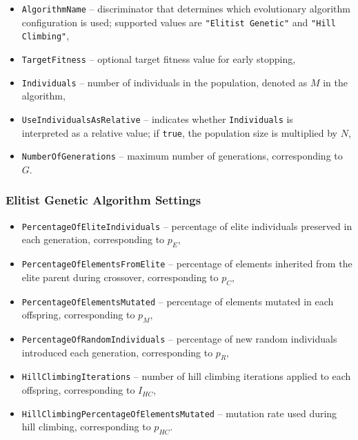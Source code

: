 \begin{itemize}
    \item \texttt{AlgorithmName} -- discriminator that determines which evolutionary algorithm configuration is used; supported values are \texttt{"Elitist Genetic"} and \texttt{"Hill Climbing"},

    \item \texttt{TargetFitness} -- optional target fitness value for early stopping,
    
    \item \texttt{Individuals} -- number of individuals in the population, denoted as $M$ in the algorithm,

    \item \texttt{UseIndividualsAsRelative} -- indicates whether \texttt{Individuals} is\\interpreted as a relative value; if \texttt{true}, the population size is multiplied by $N$,

    \item \texttt{NumberOfGenerations} -- maximum number of generations, corresponding to $G$.
\end{itemize}

\subsubsection{Elitist Genetic Algorithm Settings}

\begin{itemize}
    \item \texttt{PercentageOfEliteIndividuals} -- percentage of elite individuals preserved in each generation, corresponding to $p_E$,
    
    \item \texttt{PercentageOfElementsFromElite} -- percentage of elements inherited from the elite parent during crossover, corresponding to $p_C$,
    
    \item \texttt{PercentageOfElementsMutated} -- percentage of elements mutated in each offspring, corresponding to $p_M$,
    
    \item \texttt{PercentageOfRandomIndividuals} -- percentage of new random individuals introduced each generation, corresponding to $p_R$,
    
    \item \texttt{HillClimbingIterations} -- number of hill climbing iterations applied to each offspring, corresponding to $I_{HC}$,
    
    \item \texttt{HillClimbingPercentageOfElementsMutated} -- mutation rate used during hill climbing, corresponding to $p_{HC}$.
\end{itemize}

